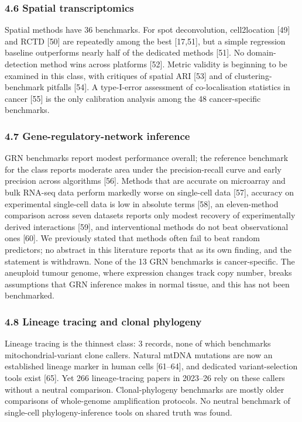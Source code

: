 \documentclass[11pt]{article}
\begin{document}
\subsubsection{4.6 Spatial
transcriptomics}\label{spatial-transcriptomics}

Spatial methods have 36 benchmarks. For spot deconvolution,
cell2location {[}49{]} and RCTD {[}50{]} are repeatedly among the best
{[}17,51{]}, but a simple regression baseline outperforms nearly half of
the dedicated methods {[}51{]}. No domain-detection method wins across
platforms {[}52{]}. Metric validity is beginning to be examined in this
class, with critiques of spatial ARI {[}53{]} and of
clustering-benchmark pitfalls {[}54{]}. A type-I-error assessment of
co-localisation statistics in cancer {[}55{]} is the only calibration
analysis among the 48 cancer-specific benchmarks.

\subsubsection{4.7 Gene-regulatory-network
inference}\label{gene-regulatory-network-inference}

GRN benchmarks report modest performance overall; the reference
benchmark for the class reports moderate area under the precision-recall
curve and early precision across algorithms {[}56{]}. Methods that are
accurate on microarray and bulk RNA-seq data perform markedly worse on
single-cell data {[}57{]}, accuracy on experimental single-cell data is
low in absolute terms {[}58{]}, an eleven-method comparison across seven
datasets reports only modest recovery of experimentally derived
interactions {[}59{]}, and interventional methods do not beat
observational ones {[}60{]}. We previously stated that methods often
fail to beat random predictors; no abstract in this literature reports
that as its own finding, and the statement is withdrawn. None of the 13
GRN benchmarks is cancer-specific. The aneuploid tumour genome, where
expression changes track copy number, breaks assumptions that GRN
inference makes in normal tissue, and this has not been benchmarked.

\subsubsection{4.8 Lineage tracing and clonal
phylogeny}\label{lineage-tracing-and-clonal-phylogeny}

Lineage tracing is the thinnest class: 3 records, none of which
benchmarks mitochondrial-variant clone callers. Natural mtDNA mutations
are now an established lineage marker in human cells {[}61--64{]}, and
dedicated variant-selection tools exist {[}65{]}. Yet 266
lineage-tracing papers in 2023--26 rely on these callers without a
neutral comparison. Clonal-phylogeny benchmarks are mostly older
comparisons of whole-genome amplification protocols. No neutral
benchmark of single-cell phylogeny-inference tools on shared truth was
found.
\end{document}
